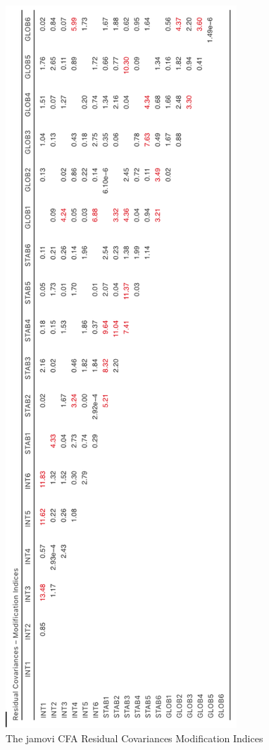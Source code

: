 \documentclass[
]{book}
\begin{document}
\begin{figure}

{\centering \includegraphics[width=1\linewidth]{img/factoranalysis/MTMM9} 

}

\caption{The jamovi CFA Residual Covariances Modification Indices}\label{fig:MTMM9}
\end{figure}
\end{document}
